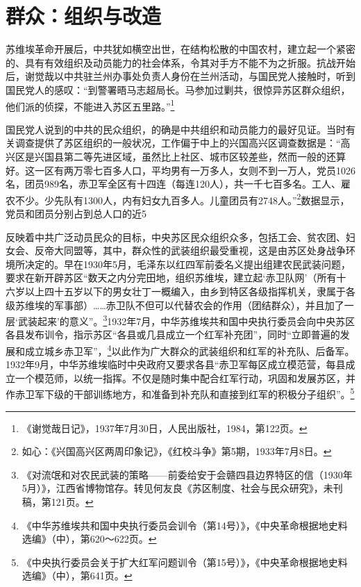 \section{群众：组织与改造}


苏维埃革命开展后，中共犹如横空出世，在结构松散的中国农村，建立起一个紧密的、具有有效组织及动员能力的社会体系，令其对手方不能不为之折服。抗战开始后，谢觉哉以中共驻兰州办事处负责人身份在兰州活动，与国民党人接触时，听到国民党人的感叹：“到警署晤马志超局长。马参加过剿共，很惊异苏区群众组织，他们派的侦探，不能进入苏区五里路。”\footnote{《谢觉哉日记》，1937年7月30日，人民出版社，1984，第122页。}


国民党人说到的中共的民众组织，的确是中共组织和动员能力的最好见证。当时有关调查提供了苏区组织的一般状况，工作偏于中上的兴国高兴区调查数据是：“高兴区是兴国县第二等先进区域，虽然比上社区、城市区较差些，然而一般的还算好。这一区有两万零七百多人口，平均男有一万多人，女则不到一万人，党员1026名，团员989名，赤卫军全区有十四连（每连120人），共一千七百多名。工人、雇农不少。少先队有1300人，内有妇女九百多人。儿童团员有2748人。”\footnote{如心：《兴国高兴区两周印象记》，《红校斗争》第5期，1933年7月8日。}数据显示，党员和团员分别占到总人口的近5%


反映着中共广泛动员民众的目标，中央苏区民众组织众多，包括工会、贫农团、妇女会、反帝大同盟等，其中，群众性的武装组织最受重视，这是由苏区处身战争环境所决定的。早在1930年5月，毛泽东以红四军前委名义提出组建农民武装问题，要求在新开辟苏区“数天之内分完田地，组织苏维埃，建立起‘赤卫队网’（所有十六岁以上四十五岁以下的男女壮丁一概编入，由乡到特区各级指挥机关，隶属于各级苏维埃的军事部）……赤卫队不但可以代替农会的作用（团结群众），并且加了一层‘武装起来’的意义”。\footnote{《对流氓和对农民武装的策略——前委给安于会赣四县边界特区的信（1930年5月）》，江西省博物馆存。转见何友良《苏区制度、社会与民众研究》，未刊稿，第121页。}1932年7月，中华苏维埃共和国中央执行委员会向中央苏区各县发布训令，指示苏区“各县或几县成立一个红军补充团”，同时“立即普遍的发展和成立城乡赤卫军”，\footnote{《中华苏维埃共和国中央执行委员会训令（第14号）》，《中央革命根据地史料选编》（中），第620～622页。}以此作为广大群众的武装组织和红军的补充队、后备军。1932年9月，中华苏维埃临时中央政府又要求各县“赤卫军每区成立模范营，每县成立一个模范师，以统一指挥。不仅是随时集中配合红军行动，巩固和发展苏区，并作赤卫军下级的干部训练地方，和准备到补充队和直接到红军的积极分子组织”。\footnote{《中央执行委员会关于扩大红军问题训令（第15号）》，《中央革命根据地史料选编》（中），第641页。}


